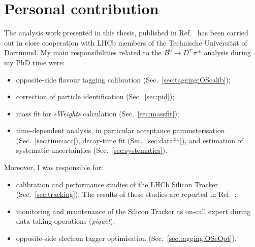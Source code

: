 
\section{Personal contribution}
\label{sec:personal_contribution}

The analysis work presented in this thesis, published in Ref.~\cite{Aaij:2018kpq} 
has been carried out in close cooperation with LHCb members of the Technische Universit\"at of Dortmund.
My main responsibilities related to the $B^0\to D^{\mp}\pi^{\pm}$ analysis during my PhD time were:
\begin{itemize}[noitemsep,topsep=0pt]	
	\item opposite-side flavour tagging calibration (Sec.~\ref{sec:tagging:OScalib});
	\item correction of particle identification (Sec.~\ref{sec:pid});
	\item mass fit for \emph{sWeights} calculation (Sec.~\ref{sec:massfit});
	\item time-dependent analysis, in particular acceptance parameterisation (Sec.~\ref{sec:time:acc}), decay-time fit (Sec.~\ref{sec:datafit}), and estimation of systematic uncertainties (Sec.~\ref{sec:systematics}).
\end{itemize}
Moreover, I was responsible for:
\begin{itemize}[noitemsep,topsep=0pt]
	\item calibration and performance studies of the LHCb Silicon Tracker (Sec.~\ref{sec:tracking}). The results of these studies are reported 
          in Ref.~\cite{spillover};
          \item monitoring and maintenance of the Silicon Tracker as on-call expert during data-taking operations (\emph{piquet});
	\item opposite-side electron tagger optimisation (Sec.~\ref{sec:tagging:OSeOpt}).
\end{itemize}

